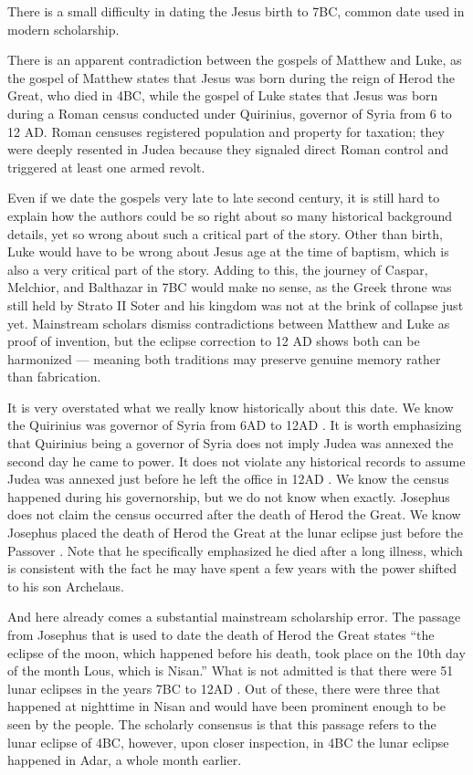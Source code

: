 There is a small difficulty in dating the Jesus birth to 7BC, common date used in modern scholarship.

There is an apparent contradiction between the gospels of Matthew and Luke, as the gospel of Matthew states that Jesus was born during the reign of Herod the Great, who died in 4BC, while the gospel of Luke states that Jesus was born during a Roman census conducted under Quirinius, governor of Syria from 6 to 12 AD.
Roman censuses registered population and property for taxation; they were deeply resented in Judea because they signaled direct Roman control and triggered at least one armed revolt.

Even if we date the gospels very late to late second century, it is still hard to explain how the authors could be so right about so many historical background details, yet so wrong about such a critical part of the story.
Other than birth, Luke would have to be wrong about Jesus age at the time of baptism, which is also a very critical part of the story.
Adding to this, the journey of Caspar, Melchior, and Balthazar in 7BC would make no sense, as the Greek throne was still held by Strato II Soter and his kingdom was not at the brink of collapse just yet.
Mainstream scholars dismiss contradictions between Matthew and Luke as proof of invention, but the eclipse correction to 12 AD shows both can be harmonized --- meaning both traditions may preserve genuine memory rather than fabrication.

It is very overstated what we really know historically about this date.
We know the Quirinius was governor of Syria from 6AD to 12AD .
It is worth emphasizing that Quirinius being a governor of Syria does not imply Judea was annexed the second day he came to power.
It does not violate any historical records to assume Judea was annexed just before he left the office in 12AD .
We know the census happened during his governorship, but we do not know when exactly.
Josephus does not claim the census occurred after the death of Herod the Great.
We know Josephus placed the death of Herod the Great at the lunar eclipse just before the Passover \cite[17.167]{josephus:ant}.
Note that he specifically emphasized he died after a long illness, which is consistent with the fact he may have spent a few years with the power shifted to his son Archelaus.

And here already comes a substantial mainstream scholarship error.
The passage from Josephus that is used to date the death of Herod the Great states ``the eclipse of the moon, which happened before his death, took place on the 10th day of the month Lous, which is Nisan.'' What is not admitted is that there were 51 lunar eclipses in the years 7BC to 12AD .
Out of these, there were three that happened at nighttime in Nisan and would have been prominent enough to be seen by the people.
The scholarly consensus is that this passage refers to the lunar eclipse of 4BC, however, upon closer inspection, in 4BC the lunar eclipse happened in Adar, a whole month earlier.

